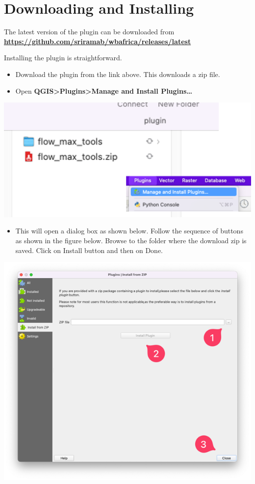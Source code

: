 \documentclass[
]{book}
\providecommand{\tightlist}{%
  \setlength{\itemsep}{0pt}\setlength{\parskip}{0pt}}
\begin{document}
\chapter{Downloading and Installing}\label{downloading-and-installing}

The latest version of the plugin can be downloaded from \textbf{\url{https://github.com/sriramab/wbafrica/releases/latest}}

Installing the plugin is straightforward.

\begin{itemize}
\tightlist
\item
  Download the plugin from the link above. This downloads a zip file.
\item
  Open \textbf{QGIS\textgreater Plugins\textgreater Manage and Install Plugins\ldots{}}
\end{itemize}

\includegraphics{./images/afterDownload.png}

\begin{itemize}
\tightlist
\item
  This will open a dialog box as shown below. Follow the sequence of buttons as shown in the figure below. Browse to the folder where the download zip is saved. Click on Install button and then on Done.
\end{itemize}

\includegraphics{./images/Installdialog.png}
\end{document}
